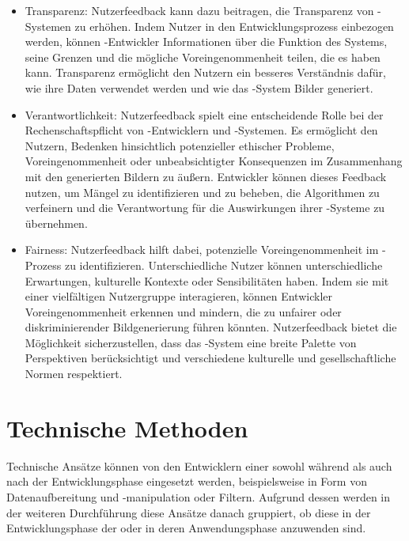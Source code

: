 \documentclass[12pt]{report}
\begin{document}
\begin{itemize}
	\item Transparenz: Nutzerfeedback kann dazu beitragen, die Transparenz von -Systemen zu erhöhen. Indem Nutzer in den Entwicklungsprozess einbezogen werden, können -Entwickler Informationen über die Funktion des Systems, seine Grenzen und die mögliche Voreingenommenheit teilen, die es haben kann. Transparenz ermöglicht den Nutzern ein besseres Verständnis dafür, wie ihre Daten verwendet werden und wie das -System Bilder generiert.
	\item Verantwortlichkeit: Nutzerfeedback spielt eine entscheidende Rolle bei der Rechenschaftspflicht von -Entwicklern und -Systemen. Es ermöglicht den Nutzern, Bedenken hinsichtlich potenzieller ethischer Probleme, Voreingenommenheit oder unbeabsichtigter Konsequenzen im Zusammenhang mit den generierten Bildern zu äußern. Entwickler können dieses Feedback nutzen, um Mängel zu identifizieren und zu beheben, die Algorithmen zu verfeinern und die Verantwortung für die Auswirkungen ihrer -Systeme zu übernehmen.
	\item Fairness: Nutzerfeedback hilft dabei, potenzielle Voreingenommenheit im -Prozess zu identifizieren. Unterschiedliche Nutzer können unterschiedliche Erwartungen, kulturelle Kontexte oder Sensibilitäten haben. Indem sie mit einer vielfältigen Nutzergruppe interagieren, können Entwickler Voreingenommenheit erkennen und mindern, die zu unfairer oder diskriminierender Bildgenerierung führen könnten. Nutzerfeedback bietet die Möglichkeit sicherzustellen, dass das -System eine breite Palette von Perspektiven berücksichtigt und verschiedene kulturelle und gesellschaftliche Normen respektiert.
\end{itemize}


\section{Technische Methoden}

Technische Ansätze können von den Entwicklern einer  sowohl während als auch nach der Entwicklungsphase eingesetzt werden, beispielsweise in Form von Datenaufbereitung und -manipulation oder Filtern. Aufgrund dessen werden in der weiteren Durchführung diese Ansätze danach gruppiert, ob diese in der Entwicklungsphase der  oder in deren Anwendungsphase anzuwenden sind.
\end{document}
